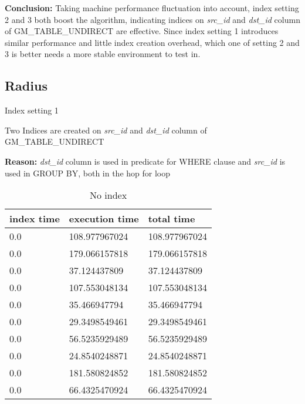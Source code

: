 \par \textbf{Conclusion:} Taking machine performance fluctuation into account, index setting 2 and 3 both boost the algorithm, indicating indices on \textit{src\_id} and \textit{dst\_id} column of GM\_TABLE\_UNDIRECT are effective. Since index setting 1 introduces similar performance and little index creation overhead, which one of setting 2 and 3 is better needs a more stable environment to test in.

\subsection{Radius}
\begin{itemize*}
\item{Index setting 1}
\par Two Indices are created on \textit{src\_id} and \textit{dst\_id} column of GM\_TABLE\_UNDIRECT
\par \textbf{Reason:} \textit{dst\_id} column is used in predicate for WHERE clause and \textit{src\_id} is used in GROUP BY, both in the hop for loop

\begin{table}[H]
\begin{center}
\begin{tabular}{|l|l|l|}
\hline
index time & execution time & total time     \\ \hline
0.0 & 108.977967024 & 108.977967024 \\ \hline
0.0 & 179.066157818 & 179.066157818 \\ \hline
0.0 & 37.124437809 & 37.124437809 \\ \hline
0.0 & 107.553048134 & 107.553048134 \\ \hline
0.0 & 35.466947794 & 35.466947794 \\ \hline
0.0 & 29.3498549461 & 29.3498549461 \\ \hline
0.0 & 56.5235929489 & 56.5235929489 \\ \hline
0.0 & 24.8540248871 & 24.8540248871 \\ \hline
0.0 & 181.580824852 & 181.580824852 \\ \hline
0.0 & 66.4325470924 & 66.4325470924 \\ \hline
\end{tabular}
\end{center}
\caption{No index}
\end{table}


\end{itemize*}
